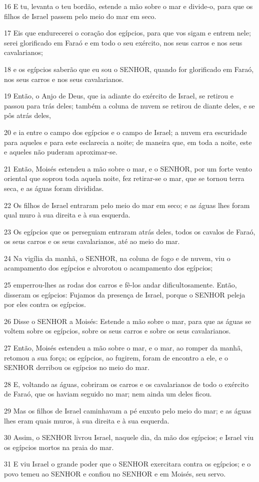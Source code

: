 \par 16 E tu, levanta o teu bordão, estende a mão sobre o mar e divide-o, para que os filhos de Israel passem pelo meio do mar em seco.
\par 17 Eis que endurecerei o coração dos egípcios, para que vos sigam e entrem nele; serei glorificado em Faraó e em todo o seu exército, nos seus carros e nos seus cavalarianos;
\par 18 e os egípcios saberão que eu sou o SENHOR, quando for glorificado em Faraó, nos seus carros e nos seus cavalarianos.
\par 19 Então, o Anjo de Deus, que ia adiante do exército de Israel, se retirou e passou para trás deles; também a coluna de nuvem se retirou de diante deles, e se pôs atrás deles,
\par 20 e ia entre o campo dos egípcios e o campo de Israel; a nuvem era escuridade para aqueles e para este esclarecia a noite; de maneira que, em toda a noite, este e aqueles não puderam aproximar-se.
\par 21 Então, Moisés estendeu a mão sobre o mar, e o SENHOR, por um forte vento oriental que soprou toda aquela noite, fez retirar-se o mar, que se tornou terra seca, e as águas foram divididas.
\par 22 Os filhos de Israel entraram pelo meio do mar em seco; e as águas lhes foram qual muro à sua direita e à sua esquerda.
\par 23 Os egípcios que os perseguiam entraram atrás deles, todos os cavalos de Faraó, os seus carros e os seus cavalarianos, até ao meio do mar.
\par 24 Na vigília da manhã, o SENHOR, na coluna de fogo e de nuvem, viu o acampamento dos egípcios e alvorotou o acampamento dos egípcios;
\par 25 emperrou-lhes as rodas dos carros e fê-los andar dificultosamente. Então, disseram os egípcios: Fujamos da presença de Israel, porque o SENHOR peleja por eles contra os egípcios.
\par 26 Disse o SENHOR a Moisés: Estende a mão sobre o mar, para que as águas se voltem sobre os egípcios, sobre os seus carros e sobre os seus cavalarianos.
\par 27 Então, Moisés estendeu a mão sobre o mar, e o mar, ao romper da manhã, retomou a sua força; os egípcios, ao fugirem, foram de encontro a ele, e o SENHOR derribou os egípcios no meio do mar.
\par 28 E, voltando as águas, cobriram os carros e os cavalarianos de todo o exército de Faraó, que os haviam seguido no mar; nem ainda um deles ficou.
\par 29 Mas os filhos de Israel caminhavam a pé enxuto pelo meio do mar; e as águas lhes eram quais muros, à sua direita e à sua esquerda.
\par 30 Assim, o SENHOR livrou Israel, naquele dia, da mão dos egípcios; e Israel viu os egípcios mortos na praia do mar.
\par 31 E viu Israel o grande poder que o SENHOR exercitara contra os egípcios; e o povo temeu ao SENHOR e confiou no SENHOR e em Moisés, seu servo.

